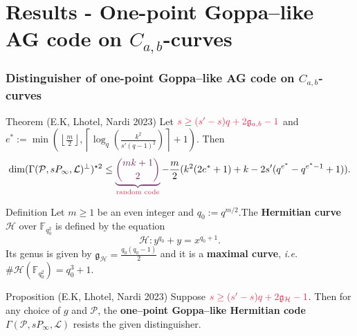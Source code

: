 \documentclass[
10pt, %
%
aspectratio=169, %
]{beamer}
\theoremstyle{plain}%
\theoremstyle{definition}
\theoremstyle{remark}
\newcommand{\calP}{\mathcal{P}}
\newcommand{\calH}{\mathcal{H}}
\newcommand{\calL}{\mathcal{L}}
\newcommand{\fqo}{\mathbb{F}_{q_0^2}}
\begin{document}
	\section{Results - One-point Goppa--like AG code on $C_{a,b}$-curves}
	\begin{frame}
		\frametitle{Distinguisher of one-point Goppa--like AG code on $C_{a,b}$-curves}
		\begin{block}{Theorem (E.K, Lhotel, Nardi 2023) }
			Let $\mathcolor{amaranth}{s \geq (s'-s)q+2\mathfrak{g}_{a,b}-1}$ and $e^* := \min\left(\left\lfloor \frac{m}{2} \right\rfloor, \left\lceil \log_q\left(\frac{k^2}{s'(q-1)^2}\right)\right\rceil+1\right)$. Then
			\vspace{-0.7em}
			$$\dim (\Gamma(\calP,sP_\infty,\calL)^{\perp})^{\star 2}\leq \mathcolor{palatinatepurple}{\underbrace{\binom{mk+1}{2}}}_{\text{\textcolor{amaranth}{random code}}} - \dfrac{m}{2}(k^2(2e^*+1)+k-2s'(q^{e^*}-q^{e^*-1}+1)). $$
		\end{block}
	\begin{block}{Definition }
		Let $m \geq 1$ be an even integer and $q_0 := q^{m/2}$.The \textbf{Hermitian curve} $\calH$ over $\fqo$ is defined by the equation
		\vspace{-0.7em}
		\[\calH : y^{q_0}+y = x^{q_0+1}.\]
		Its genus is given by $\mathfrak{g}_{\calH} = \frac{q_0(q_0-1)}{2}$ and it is a \textbf{maximal curve}, \emph{i.e.} $\#\calH(\fqo) = q_0^3+1$.
	\end{block}
	
		\begin{block}{Proposition (E.K, Lhotel, Nardi 2023)} 
			Suppose $\mathcolor{amaranth}{s \geq (s'-s)q+2\mathfrak{g}_{\calH}-1}$. Then for any choice of $g$ and $\calP$, the \textbf{one--point Goppa--like Hermitian code} $\Gamma(\calP,sP_\infty,\calL)$ resists the given distinguisher.
		\end{block}
		
	\end{frame}
	
%	
%		
%		
%		
%		
%	
	
\end{document}
